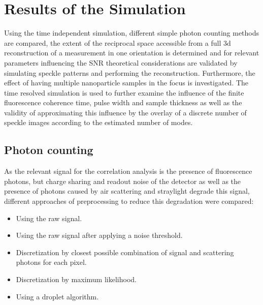 
\clearpage
\section{Results of the Simulation}
Using the time independent simulation, different simple photon counting methods are compared, the extent of the reciprocal space accessible from a full 3d reconstruction of a measurement in one orientation is determined and for relevant parameters influencing the SNR theoretical considerations are validated by simulating speckle patterns and performing the reconstruction. Furthermore, the effect of having multiple nanoparticle samples in the focus is investigated. The time resolved simulation is used to further examine the influence of the finite fluorescence coherence time, pulse width and sample thickness as well as the validity of approximating this influence by the overlay of a discrete number of speckle images according to the estimated number of modes.

\subsection{Photon counting}
As the relevant signal for the correlation analysis is the presence of fluorescence photons, but charge sharing and readout noise of the detector as well as the presence of photons caused by air scattering and straylight degrade this signal, different approaches of preprocessing to reduce this degradation were compared:
\begin{samepage}
\begin{itemize}[nosep]
	\item Using the raw signal.
	\item Using the raw signal after applying a noise threshold.
	\item Discretization by closest possible combination of signal and scattering photons for each pixel.
	\item Discretization by maximum likelihood.
	\item Using a droplet algorithm.
\end{itemize}
\end{samepage}

